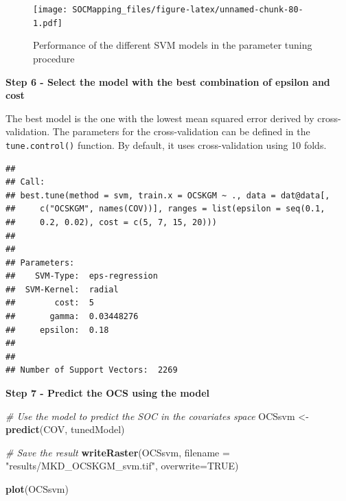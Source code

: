 \documentclass[10pt,b5paper,]{book}
\newenvironment{Shaded}{\begin{snugshade}}{\end{snugshade}}
\newcommand{\CommentTok}[1]{\textcolor[rgb]{0.56,0.35,0.01}{\textit{#1}}}
\newcommand{\DataTypeTok}[1]{\textcolor[rgb]{0.13,0.29,0.53}{#1}}
\newcommand{\KeywordTok}[1]{\textcolor[rgb]{0.13,0.29,0.53}{\textbf{#1}}}
\newcommand{\NormalTok}[1]{#1}
\newcommand{\OperatorTok}[1]{\textcolor[rgb]{0.81,0.36,0.00}{\textbf{#1}}}
\newcommand{\OtherTok}[1]{\textcolor[rgb]{0.56,0.35,0.01}{#1}}
\newcommand{\StringTok}[1]{\textcolor[rgb]{0.31,0.60,0.02}{#1}}
\theoremstyle{definition}
\theoremstyle{definition}
\theoremstyle{definition}
\theoremstyle{remark}
\begin{document}
\begin{figure}
\centering
\texttt{[image: SOCMapping\_files/figure-latex/unnamed-chunk-80-1.pdf]}
\caption{\label{fig:unnamed-chunk-80}Performance of the different SVM models
in the parameter tuning procedure}
\end{figure}

\textbf{Step 6 - Select the model with the best combination of epsilon
and cost}

The best model is the one with the lowest mean squared error derived by
cross-validation. The parameters for the cross-validation can be defined
in the \texttt{tune.control()} function. By default, it uses
cross-validation using 10 folds.

\begin{Shaded}
\end{Shaded}

\begin{verbatim}
## 
## Call:
## best.tune(method = svm, train.x = OCSKGM ~ ., data = dat@data[, 
##     c("OCSKGM", names(COV))], ranges = list(epsilon = seq(0.1, 
##     0.2, 0.02), cost = c(5, 7, 15, 20)))
## 
## 
## Parameters:
##    SVM-Type:  eps-regression 
##  SVM-Kernel:  radial 
##        cost:  5 
##       gamma:  0.03448276 
##     epsilon:  0.18 
## 
## 
## Number of Support Vectors:  2269
\end{verbatim}

\textbf{Step 7 - Predict the OCS using the model}

\begin{Shaded}
\begin{Highlighting}[]
\CommentTok{# Use the model to predict the SOC in the covariates space}
\NormalTok{OCSsvm <-}\StringTok{ }\KeywordTok{predict}\NormalTok{(COV, tunedModel)}

\CommentTok{# Save the result}
\KeywordTok{writeRaster}\NormalTok{(OCSsvm, }\DataTypeTok{filename =} \StringTok{"results/MKD_OCSKGM_svm.tif"}\NormalTok{,}
            \DataTypeTok{overwrite=}\OtherTok{TRUE}\NormalTok{)}

\KeywordTok{plot}\NormalTok{(OCSsvm)}
\end{Highlighting}
\end{Shaded}
\end{document}
